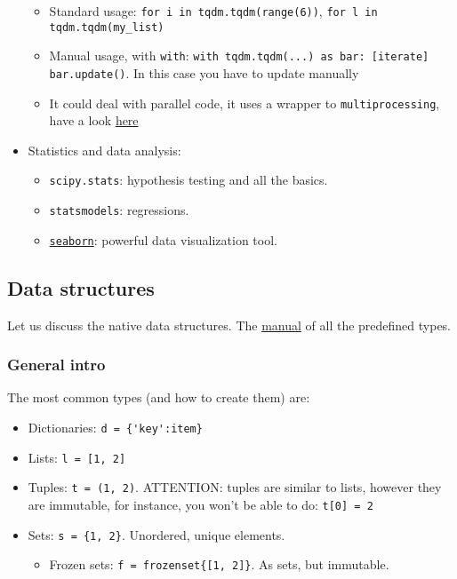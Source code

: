 \documentclass[a4paper,12pt,%
              final%
              ]{article}
\begin{document}
\begin{itemize}
\begin{itemize}
      \item Standard usage: \verb|for i in tqdm.tqdm(range(6))|, \verb|for l in tqdm.tqdm(my_list)|
      \item Manual usage, with \texttt{with}: \verb|with tqdm.tqdm(...) as bar: [iterate] bar.update()|. In this case you have to update manually
      \item It could deal with parallel code, it uses a wrapper to \texttt{multiprocessing}, have a look \href{https://tqdm.github.io/docs/contrib.concurrent/}{here}
    \end{itemize}
  \item Statistics and data analysis:
    \begin{itemize}
      \item \texttt{scipy.stats}: hypothesis testing and all the basics.
      \item \texttt{statsmodels}: regressions.
      \item \href{https://seaborn.pydata.org/introduction.html}{\texttt{seaborn}}: powerful data visualization tool.
    \end{itemize}
\end{itemize}

\subsection{Data structures}
Let us discuss the native data structures. The \href{https://docs.python.org/3/library/stdtypes.html}{manual} of all the predefined types.
\subsubsection{General intro}
The most common types (and how to create them) are:
\begin{itemize}
  \item Dictionaries: \verb|d = {'key':item}|
  \item Lists: \verb|l = [1, 2]|
  \item Tuples: \verb|t = (1, 2)|. ATTENTION: tuples are similar to lists, however they are immutable, for instance, you won't be able to do: \verb|t[0] = 2|
  \item Sets: \verb|s = {1, 2}|. Unordered, unique elements.
    \begin{itemize}
      \item Frozen sets: \verb|f = frozenset{[1, 2]}|. As sets, but immutable.
    \end{itemize}
\end{itemize}
\end{document}
